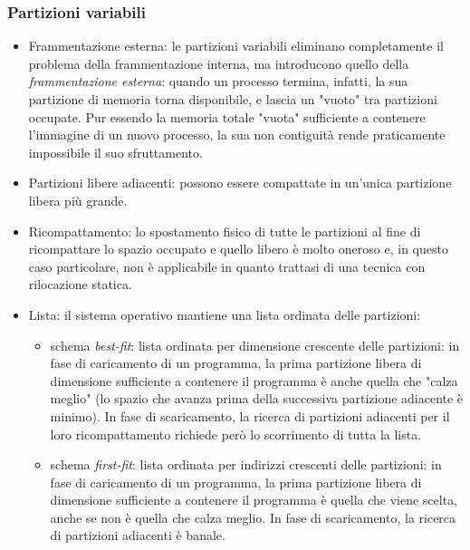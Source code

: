 \documentclass[12pt,a4paper]{article}
\begin{document}
\subsubsection{Partizioni variabili}
\begin{itemize}
  \item Frammentazione esterna: le partizioni variabili eliminano
    completamente il problema della frammentazione interna, ma
    introducono quello della \emph{frammentazione esterna}: quando
    un processo termina, infatti, la sua partizione di memoria
    torna disponibile, e lascia un "vuoto" tra partizioni occupate.
    Pur essendo la memoria totale "vuota" sufficiente a contenere
    l'immagine di un nuovo processo, la sua non contiguità rende
    praticamente impossibile il suo sfruttamento.
  \item Partizioni libere adiacenti: possono essere compattate in
    un'unica partizione libera più grande.
  \item Ricompattamento: lo spostamento fisico di tutte le
    partizioni al fine di ricompattare lo spazio occupato e quello
    libero è molto oneroso e, in questo caso particolare, non è
    applicabile in quanto trattasi di una tecnica con rilocazione
    statica.
  \item Lista: il sistema operativo mantiene una lista ordinata
    delle partizioni:
    \begin{itemize}
      \item schema \emph{best-fit}: lista ordinata per dimensione
        crescente delle partizioni: in fase di caricamento di un
        programma, la prima partizione libera di dimensione
        sufficiente a contenere il programma è anche quella che
        "calza meglio" (lo spazio che avanza prima della successiva
        partizione adiacente è minimo). In fase di scaricamento, la
        ricerca di partizioni adiacenti per il loro ricompattamento
        richiede però lo scorrimento di tutta la lista.
      \item schema \emph{first-fit}: lista ordinata per indirizzi
        crescenti delle partizioni: in fase di caricamento di un
        programma, la prima partizione libera di dimensione
        sufficiente a contenere il programma è quella che viene
        scelta, anche se non è quella che calza meglio. In fase di
        scaricamento, la ricerca di partizioni adiacenti è banale.
    \end{itemize}
\end{itemize}
\end{document}

